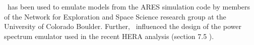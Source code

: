 \name~has been used to emulate models from the ARES\cite{ARES_sim} simulation code by members of the Network for Exploration and Space Science research group at the University of Colorado Boulder. Further, \name~influenced the design of the power spectrum emulator used in the recent HERA analysis (section 7.5 \cite{HERA_2022c}).

